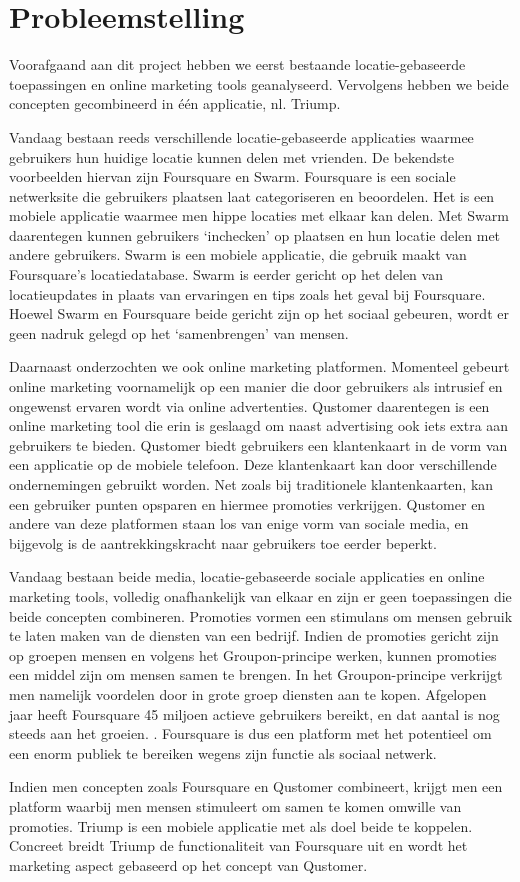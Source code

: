 \chapter{Probleemstelling}
Voorafgaand aan dit project hebben we eerst bestaande locatie-gebaseerde toepassingen en online marketing tools geanalyseerd. Vervolgens hebben we beide concepten gecombineerd in één applicatie, nl. Triump.

Vandaag bestaan reeds verschillende locatie-gebaseerde applicaties waarmee gebruikers hun huidige locatie kunnen delen met vrienden. 
De bekendste voorbeelden hiervan zijn Foursquare\cite{foursquare} en Swarm\cite{swarm}.
Foursquare is een sociale netwerksite die gebruikers plaatsen laat categoriseren en beoordelen.
Het is een mobiele applicatie waarmee men hippe locaties met elkaar kan delen. Met Swarm daarentegen kunnen gebruikers `inchecken' op plaatsen en hun locatie delen met andere gebruikers. Swarm is een mobiele applicatie, die gebruik maakt van Foursquare's locatiedatabase. Swarm is eerder gericht op het delen van locatieupdates in plaats van ervaringen en tips zoals het geval bij Foursquare.
Hoewel Swarm en Foursquare beide gericht zijn op het sociaal gebeuren, wordt er geen nadruk gelegd op het `samenbrengen' van mensen. 

Daarnaast onderzochten we ook online marketing platformen. Momenteel gebeurt online marketing voornamelijk op een manier die door gebruikers als intrusief en ongewenst ervaren wordt via online advertenties. Qustomer\cite{qustomer} daarentegen is een online marketing tool die erin is geslaagd om naast advertising ook iets extra aan gebruikers te bieden. Qustomer biedt gebruikers een klantenkaart in de vorm van een applicatie op de mobiele telefoon. Deze klantenkaart kan door verschillende ondernemingen gebruikt worden. Net zoals bij traditionele klantenkaarten, kan een gebruiker punten opsparen en hiermee promoties verkrijgen. Qustomer en andere van deze platformen staan los van enige vorm van sociale media, en bijgevolg is de aantrekkingskracht naar gebruikers toe eerder beperkt.

Vandaag bestaan beide media, locatie-gebaseerde sociale applicaties en online marketing tools, volledig onafhankelijk van elkaar en zijn er geen toepassingen die beide concepten combineren. 
Promoties vormen een stimulans om mensen gebruik te laten maken van de diensten van een bedrijf. Indien de promoties gericht zijn op groepen mensen en volgens het Groupon-principe werken, kunnen promoties een middel zijn om mensen samen te brengen.
In het Groupon-principe verkrijgt men namelijk voordelen door in grote groep diensten aan te kopen.
Afgelopen jaar heeft Foursquare 45 miljoen actieve gebruikers bereikt, en dat aantal is nog steeds aan het groeien. \cite{users}. Foursquare is dus een platform met het potentieel om een enorm publiek te bereiken wegens zijn functie als sociaal netwerk. 

Indien men concepten zoals Foursquare en Qustomer combineert, krijgt men een platform waarbij men mensen stimuleert om samen te komen omwille van promoties.
Triump is een mobiele applicatie met als doel beide te koppelen.
Concreet breidt Triump de functionaliteit van Foursquare uit en wordt het marketing aspect gebaseerd op het concept van Qustomer.

